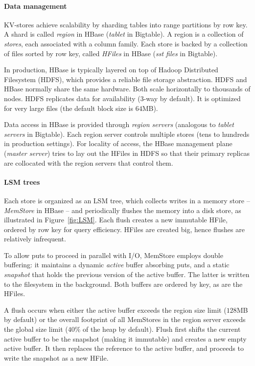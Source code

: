 \paragraph{Data management}
KV-stores achieve scalability by sharding tables into range partitions by row key. 
A shard is called {\em region\/} in HBase (\emph{tablet} in Bigtable). 
A region is a collection of \emph{stores}, each associated with a column family. 
Each store is backed by a collection of files sorted by row key, called \emph{HFiles} in HBase 
(\emph{sst files} in Bigtable). 

In production, HBase is typically layered on top of Hadoop Distributed Filesystem (HDFS), 
which provides a reliable file storage abstraction. HDFS and HBase normally share the same hardware. 
Both scale horizontally to thousands of nodes. HDFS replicates data for availability (3-way by default). 
It is optimized for very large files (the default block size is $64$MB).

Data access in HBase is provided through {\em region servers} (analogous to {\em tablet servers}
in Bigtable). Each region server controls multiple stores (tens to hundreds in production settings). 
For locality of access, the HBase management plane (\emph{master server}) tries to lay out the 
HFiles in HDFS so that their primary replicas are collocated with the region servers that control them. 

\paragraph{LSM trees}
Each store is organized as an LSM tree, which collects writes in a memory store --
\emph{MemStore} in HBase -- and periodically flushes the memory into a disk store, as illustrated in 
Figure~\ref{fig:LSM}. Each flush creates a new immutable HFile, ordered by row key for query efficiency. 
HFiles are created big, hence flushes are relatively infrequent. 

To allow puts to proceed in parallel with I/O, MemStore employs double buffering:
it maintains a dynamic \emph{active} buffer absorbing puts, and a static \emph{snapshot}
that holds the previous version of the active buffer. The latter is written to the 
filesystem in the background. Both buffers are ordered by key, as are the HFiles.  

A flush occurs  when either the active buffer 
exceeds the region size limit ($128$MB by default) or  the overall footprint of all MemStores
in the region server exceeds the global size limit ($40\%$ of the heap by default). 
Flush first shifts the current active buffer to be the snapshot (making it immutable) and creates a new empty active buffer.
It then replaces the reference to the active buffer, and proceeds to write the snapshot as a new HFile. 

